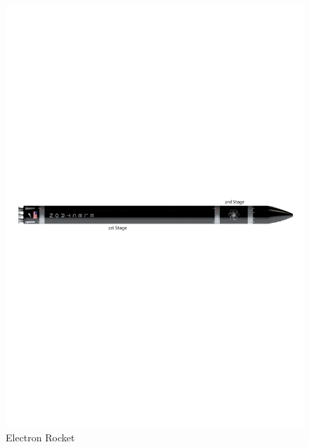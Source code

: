\begin{figure}[H]
\centering 
\includegraphics[scale=0.7]{./sections/Constellation_Deployment/S2-Launcher/Images_S2/Picture_1_S2.pdf} 
\caption{Electron Rocket}
\label{fig:rocket}
\end{figure}

